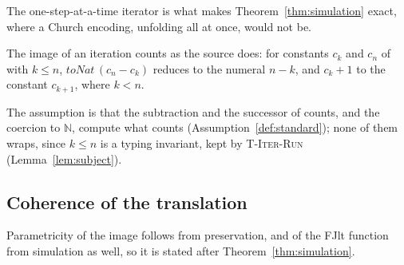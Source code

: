The one-step-at-a-time iterator is what makes Theorem~\ref{thm:simulation} exact, where a Church encoding, unfolding all at once, would not be.

\begin{assumption}[Iteration]
\label{ass:ranges}
The image of an iteration counts as the source does: for constants $c_k$ and $c_n$ of  with $k \le n$, $\mathit{toNat}\,(c_n - c_k)$ reduces to the numeral $n - k$, and $c_k + 1$ to the constant $c_{k+1}$, where $k < n$.
\end{assumption}

The assumption is that the subtraction and the successor of counts, and the coercion to $\mathbb{N}$, compute what  counts (Assumption~\ref{def:standard}); none of them wraps, since $k \le n$ is a typing invariant, kept by \textsc{T-Iter-Run} (Lemma~\ref{lem:subject}).

\subsection{Coherence of the translation}

Parametricity of the image follows from preservation, and of the FJlt function from simulation as well, so it is stated after Theorem~\ref{thm:simulation}.

